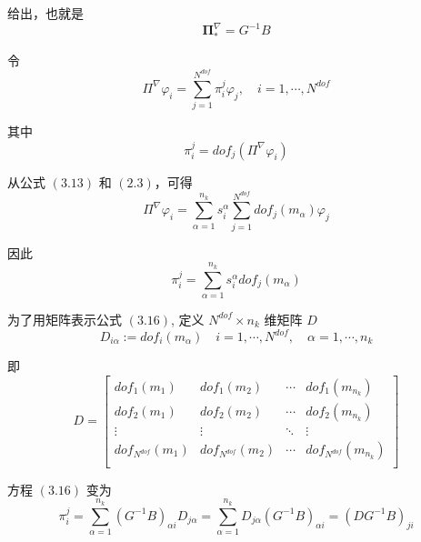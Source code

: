 给出，也就是 \\
\begin{equation}
\boldsymbol{\Pi}_{\ast}^{\nabla} = G^{-1}B
\end{equation}

令 \\
\begin{equation*}
\Pi^{\nabla} \varphi_i = \sum_{j=1}^{N^{dof}}\pi_i^j \varphi_j, \quad i = 1,\cdots,N^{dof}
\end{equation*}

其中 \\
\begin{equation*}
\pi_i^j = dof_j(\Pi^{\nabla}\varphi_i)
\end{equation*}

从公式 $(3.13)$ 和 $(2.3)$，可得 \\
\begin{equation*}
\Pi^{\nabla} \varphi_i = \sum_{\alpha=1}^{n_k}s_i^{\alpha}\sum_{j=1}^{N^{dof}}dof_j(m_{\alpha})\varphi_j
\end{equation*}

因此 \\
\begin{equation}
\pi_i^j = \sum_{\alpha=1}^{n_k}s_i^{\alpha}dof_j(m_{\alpha})
\end{equation}

为了用矩阵表示公式 $(3.16)$, 定义 $N^{dof}\times n_k$ 维矩阵 $D$ \\
\begin{equation*}
D_{i\alpha} := dof_i(m_{\alpha})\quad i = 1,\cdots,N^{dof},\quad\alpha = 1,\cdots,n_k
\end{equation*}

即 \\
\begin{equation}
D = \begin{bmatrix}
dof_1(m_1) & dof_1(m_2) & \cdots & dof_1(m_{n_k})\\
dof_2(m_1) & dof_2(m_2) & \cdots & dof_2(m_{n_k})\\
\vdots & \vdots & \ddots & \vdots\\
dof_{N^{dof}}(m_1) & dof_{N^{dof}}(m_2) & \cdots & dof_{N^{dof}}(m_{n_k})\\
\end{bmatrix}
\end{equation}

方程 $(3.16)$ 变为 \\
\begin{equation*}
\pi_i^j = \sum_{\alpha=1}^{n_k}(G^{-1}B)_{\alpha i}D_{j \alpha} = \sum_{\alpha=1}^{n_k}D_{j \alpha}(G^{-1}B)_{\alpha i} = (DG^{-1}B)_{ji}
\end{equation*}

